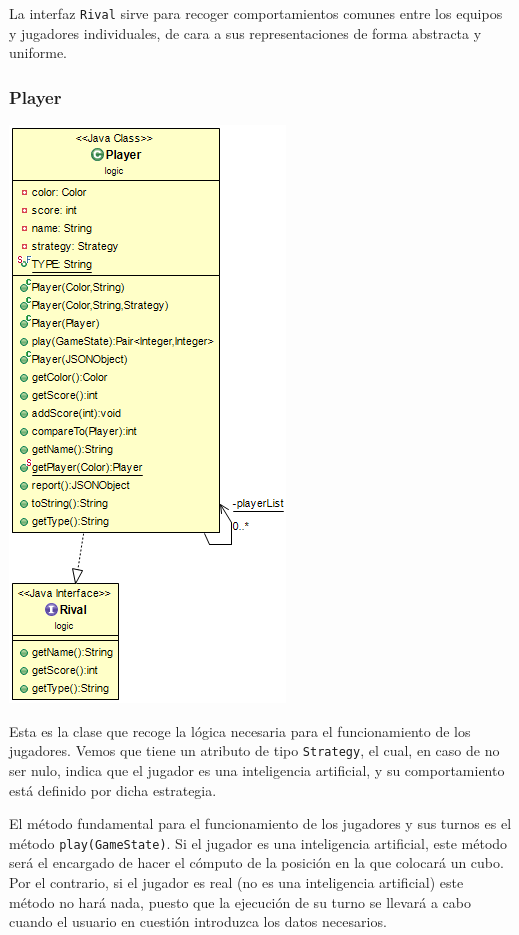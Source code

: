 \documentclass[../DocumentoOficial.tex]{subfiles}
\begin{document}
La interfaz \texttt{Rival} sirve para recoger comportamientos comunes entre los equipos y jugadores individuales, de cara a sus representaciones de forma abstracta y uniforme.

\subsubsection{Player}

\begin{center}
\includegraphics[scale=0.75]{Player-sprint7.png} 
\end{center}

Esta es la clase que recoge la lógica necesaria para el funcionamiento de los jugadores. Vemos que tiene un atributo de tipo \texttt{Strategy}, el cual, en caso de no ser nulo, indica que el jugador es una inteligencia artificial, y su comportamiento está definido por dicha estrategia.

El método fundamental para el funcionamiento de los jugadores y sus turnos es el método \texttt{play(GameState)}. Si el jugador es una inteligencia artificial, este método será el encargado de hacer el cómputo de la posición en la que colocará un cubo. Por el contrario, si el jugador es real (no es una inteligencia artificial) este método no hará nada, puesto que la ejecución de su turno se llevará a cabo cuando el usuario en cuestión introduzca los datos necesarios.
\end{document}
